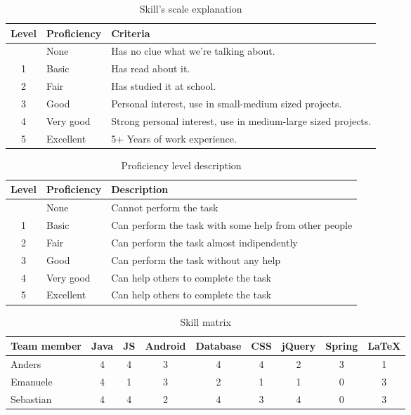 \begin{table}[h]
\begin{center}
\begin{tabular}{ | c | l | l | }
  \hline
  Level & Proficiency & Criteria \\
  \hline\noalign{\smallskip}\hline
  0 & None		& Has no clue what we're talking about. \\
  1 & Basic		& Has read about it.\\
  2 & Fair		& Has studied it at school.\\
  3 & Good		& Personal interest, use in small-medium sized projects.\\
  4 & Very good	& Strong personal interest, use in medium-large sized projects. \\
  5 & Excellent	& 5+ Years of work experience. \\
  \hline
\end{tabular}
\end{center}
\caption{Skill's scale explanation}
\label{table:skillscale}
\end{table}

\begin{table}[h]
\begin{center}
\begin{tabular}{ | c | l | l | }
  \hline
  Level & Proficiency & Description \\
  \hline\noalign{\smallskip}\hline
  0 & None		  & Cannot perform the task \\
  1 & Basic     & Can perform the task with some help from other people \\
  2 & Fair		  & Can perform the task almost indipendently \\
  3 & Good		  & Can perform the task without any help \\
  4 & Very good	& Can help others to complete the task \\
  5 & Excellent	& Can help others to complete the task \\
  \hline
\end{tabular}
\end{center}
\caption{Proficiency level description}
\label{table:proficiency}
\end{table}

\begin{table}[h]
\begin{center}
\begin{tabular}{ | l | c | c | c | c | c | c | c | c | }
  \hline
  Team member & Java & JS & Android & Database & CSS & jQuery & Spring & LaTeX \\
  \hline\noalign{\smallskip}\hline
  Anders & 4 & 4 & 3 & 4 & 4 & 2 & 3 & 1 \\
  Emanuele & 4 & 1 & 3 & 2 & 1 & 1 & 0 & 3 \\
  Sebastian & 4 & 4 & 2 & 4 & 3 & 4 & 0 & 3 \\
  \hline
\end{tabular}
\end{center}
\caption{Skill matrix}
\label{table:skillmatrix}
\end{table}


